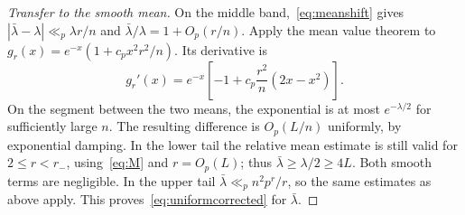 \documentclass[11pt]{article}
\theoremstyle{definition}\newtheorem{definition}[theorem]{Definition}
\theoremstyle{remark}\newtheorem{remark}[theorem]{Remark}
\newcommand{\la}{\lambda}
\begin{document}
\begin{proof}[Transfer to the smooth mean]
On the middle band,~\eqref{eq:meanshift} gives
$|\bar\la-\la|\ll_p\la r/n$ and
$\bar\la/\la=1+O_p(r/n)$. Apply the mean value theorem to
$g_r(x)=e^{-x}(1+c_px^2r^2/n)$. Its derivative is
\[
 g_r'(x)=e^{-x}\left[-1+c_p\frac{r^2}n(2x-x^2)\right].
\]
On the segment between the two means, the exponential is at most
$e^{-\la/2}$ for sufficiently large $n$. The resulting difference is
$O_p(L/n)$ uniformly, by exponential damping.
In the lower tail the relative mean estimate is still valid for
$2\le r<r_-$, using~\eqref{eq:M} and $r=O_p(L)$; thus
$\bar\la\ge\la/2\ge4L$. Both smooth terms are negligible.
In the upper tail $\bar\la\ll_p n^2p^r/r$, so the same estimates as above
apply. This proves~\eqref{eq:uniformcorrected} for $\bar\la$.
\end{proof}
\end{document}
